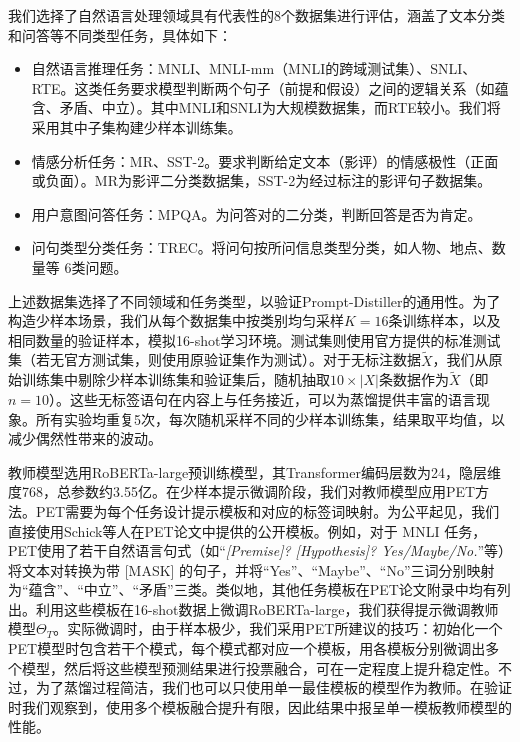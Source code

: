 \documentclass[../main.tex]{subfiles}
\begin{document}
\label{sec:ch3-5-1-experimental-setup}


我们选择了自然语言处理领域具有代表性的8个数据集进行评估，涵盖了文本分类和问答等不同类型任务，具体如下：
\begin{itemize}
	\item 自然语言推理任务：MNLI、MNLI-mm（MNLI的跨域测试集）、SNLI、RTE\cite{broadcoveragechallenge_williams_2018,largeannotatedcorpus_bowman_2015,semeval2013task_dzikovska_2013}。这类任务要求模型判断两个句子（前提和假设）之间的逻辑关系（如蕴含、矛盾、中立）。其中MNLI和SNLI为大规模数据集，而RTE较小。我们将采用其中子集构建少样本训练集。
	\item 情感分析任务：MR、SST-2\cite{seeingstarsexploiting_pang_2005,recursivedeepmodels_socher_2013}。要求判断给定文本（影评）的情感极性（正面或负面）。MR为影评二分类数据集，SST-2为经过标注的影评句子数据集。
	\item 用户意图问答任务：MPQA\cite{mpqa3.0entity/event_deng_2015}。为问答对的二分类，判断回答是否为肯定。
	\item 问句类型分类任务：TREC\cite{learningquestionclassifiers_li_2005}。将问句按所问信息类型分类，如人物、地点、数量等 6类问题。
\end{itemize}
上述数据集选择了不同领域和任务类型，以验证Prompt-Distiller的通用性。为了构造少样本场景，我们从每个数据集中按类别均匀采样$K=16$条训练样本，以及相同数量的验证样本，模拟16-shot学习环境。测试集则使用官方提供的标准测试集（若无官方测试集，则使用原验证集作为测试）。对于无标注数据$\tilde{X}$，我们从原始训练集中剔除少样本训练集和验证集后，随机抽取$10 \times |X|$条数据作为$\tilde{X}$（即$n=10$）。这些无标签语句在内容上与任务接近，可以为蒸馏提供丰富的语言现象。所有实验均重复5次，每次随机采样不同的少样本训练集，结果取平均值，以减少偶然性带来的波动。


教师模型选用RoBERTa-large预训练模型\cite{robertarobustlyoptimized_liu_2019}，其Transformer编码层数为24，隐层维度768，总参数约3.55亿。在少样本提示微调阶段，我们对教师模型应用PET方法\cite{exploitingclozequestions_schick_2021}。PET需要为每个任务设计提示模板和对应的标签词映射。为公平起见，我们直接使用Schick等人在PET论文中提供的公开模板。例如，对于 MNLI 任务，PET使用了若干自然语言句式（如“\textit{[Premise]? [Hypothesis]? Yes/Maybe/No.}”等）将文本对转换为带 [MASK] 的句子，并将“Yes”、“Maybe”、“No”三词分别映射为“蕴含”、“中立”、“矛盾”三类。类似地，其他任务模板在PET论文附录中均有列出。利用这些模板在16-shot数据上微调RoBERTa-large，我们获得提示微调教师模型$\Theta_T$。实际微调时，由于样本极少，我们采用PET所建议的技巧：初始化一个PET模型时包含若干个模式，每个模式都对应一个模板，用各模板分别微调出多个模型，然后将这些模型预测结果进行投票融合，可在一定程度上提升稳定性。不过，为了蒸馏过程简洁，我们也可以只使用单一最佳模板的模型作为教师。在验证时我们观察到，使用多个模板融合提升有限，因此结果中报呈单一模板教师模型的性能。
\end{document}
